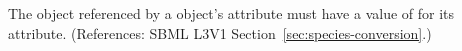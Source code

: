The \Parameter object referenced by a \Species object's
 attribute must have a value of  for its
 attribute.  (References: SBML L3V1
Section~\ref{sec:species-conversion}.)
